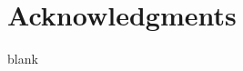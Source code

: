 \section*{Acknowledgments}
blank

\thefontsize\tiny
\thefontsize\scriptsize
\thefontsize\footnotesize
\thefontsize\small
\thefontsize\normalsize
\thefontsize\large
\thefontsize\Large
\thefontsize\LARGE
\thefontsize\huge
\thefontsize\Huge
